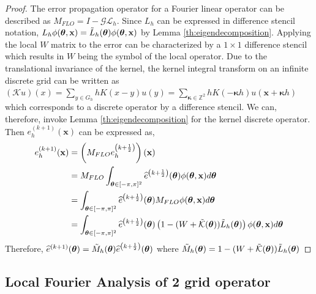\documentclass[12pt]{article}
\begin{document}
\begin{proof}
    The error propagation operator for a Fourier linear operator can be described as $M_{FLO} = I - \mathcal{G}\mathcal{L}_h$. Since $L_h$ can be expressed in difference stencil notation,  $L_h \phi(\boldsymbol{\theta}, \mathbf{x}) = \Tilde{L}_h(\boldsymbol{\theta})\phi(\boldsymbol{\theta}, \mathbf{x})$ by Lemma \ref{th:eigendecomposition}. Applying the local $W$ matrix to the error can be characterized by a $1 \times 1$ difference stencil which results in $W$ being the symbol of the local operator. Due to the translational invariance of the kernel, the kernel integral transform on an infinite discrete grid can be written as  $(\mathcal{K}u)(x) =  \sum_{y \in G_h}hK(x - y)u(y) = \sum_{\boldsymbol{\kappa} \in \mathbb{Z}^2}hK(-\boldsymbol{\kappa}h)u(\mathbf{x} + \boldsymbol{\kappa}h)$ which corresponds to a discrete operator by a difference stencil. We can, therefore, invoke Lemma \ref{th:eigendecomposition} for the kernel discrete operator. Then $e^{(k + 1)}_h(\mathbf{x})$ can be expressed as, 
    \begin{align*}
        e^{(k + 1)}_h(\mathbf{x}) &= \left(M_{FLO} e^{\left(k + \frac{1}{2}\right)}_h\right)(\mathbf{x}) \\
        &= M_{FLO} \int_{\boldsymbol{\theta} \in [-\pi, \pi]^2}  \widehat{e}^{\left(k + \frac{1}{2}\right)}(\boldsymbol{\theta})\phi(\boldsymbol{\theta},\mathbf{x})d\boldsymbol{\theta} \\
        &= \int_{\boldsymbol{\theta} \in [-\pi, \pi]^2}  \widehat{e}^{\left(k + \frac{1}{2}\right)}(\boldsymbol{\theta}) M_{FLO} \phi(\boldsymbol{\theta},\mathbf{x})d\boldsymbol{\theta} \\
        &= \int_{\boldsymbol{\theta} \in [-\pi, \pi]^2}  \widehat{e}^{\left(k + \frac{1}{2}\right)}(\boldsymbol{\theta}) \left(1 - (W + \Tilde{\mathcal{K}}(\boldsymbol{\theta}))\Tilde{L}_h(\boldsymbol{\theta})\right) \phi(\boldsymbol{\theta},\mathbf{x})d\boldsymbol{\theta}
    \end{align*}
    Therefore, $\widehat{e}^{(k + 1)}(\boldsymbol{\theta}) = \Tilde{M}_{h}(\boldsymbol{\theta})\widehat{e}^{\left(k + \frac{1}{2}\right)}(\boldsymbol{\theta})$ where $\Tilde{M}_{h}(\boldsymbol{\theta}) = 1 - (W + \Tilde{\mathcal{K}}(\boldsymbol{\theta}))\Tilde{L}_h(\boldsymbol{\theta})$
\end{proof}


\subsection{Local Fourier Analysis of 2 grid operator} \label{sec:lfa2grid}
\end{document}
